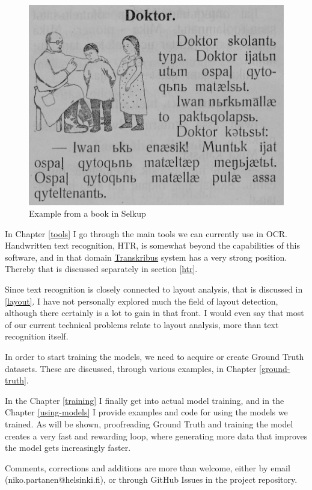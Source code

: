 \documentclass[]{book}
\begin{document}
\begin{figure}
\centering
\includegraphics{images/doctor_sel.png}
\caption{Example from a book in Selkup}
\end{figure}

In Chapter \ref{tools} I go through the main tools we can currently use in OCR. Handwritten text recognition, HTR, is somewhat beyond the capabilities of this software, and in that domain \href{https://transkribus.eu/Transkribus/}{Transkribus} system has a very strong position. Thereby that is discussed separately in section \ref{htr}.

Since text recognition is closely connected to layout analysis, that is discussed in \ref{layout}. I have not personally explored much the field of layout detection, although there certainly is a lot to gain in that front. I would even say that most of our current technical problems relate to layout analysis, more than text recognition itself.

In order to start training the models, we need to acquire or create Ground Truth datasets. These are discussed, through various examples, in Chapter \ref{ground-truth}.

In the Chapter \ref{training} I finally get into actual model training, and in the Chapter \ref{using-models} I provide examples and code for using the models we trained. As will be shown, proofreading Ground Truth and training the model creates a very fast and rewarding loop, where generating more data that improves the model gets increasingly faster.

Comments, corrections and additions are more than welcome, either by email (niko.partanen@helsinki.fi), or through GitHub Issues in the project repository.
\end{document}
